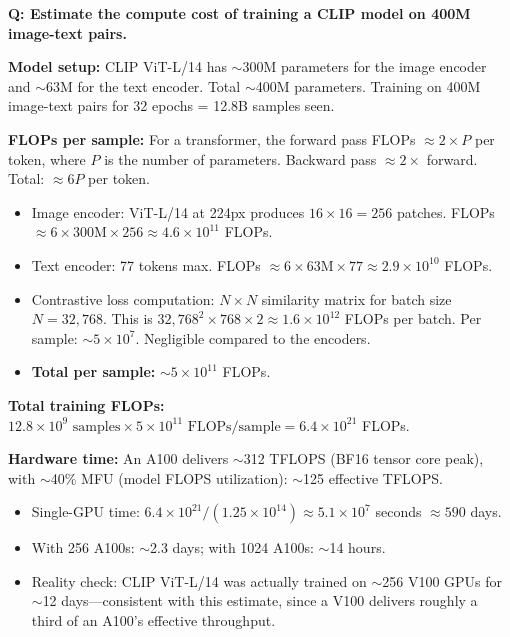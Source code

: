 \begin{interviewq}
\textbf{Q: Estimate the compute cost of training a CLIP model on 400M image-text pairs.}

 \quad {} \quad \badgefreq{\freqlow}

\stronganswer

\textbf{Model setup:} CLIP ViT-L/14 has $\sim$300M parameters for the image encoder and $\sim$63M for the text encoder. Total $\sim$400M parameters. Training on 400M image-text pairs for 32 epochs = 12.8B samples seen.

\textbf{FLOPs per sample:} For a transformer, the forward pass FLOPs $\approx 2 \times P$ per token, where $P$ is the number of parameters. Backward pass $\approx 2\times$ forward. Total: $\approx 6P$ per token.
\begin{itemize}
    \item Image encoder: ViT-L/14 at 224px produces $16 \times 16 = 256$ patches. FLOPs $\approx 6 \times 300\text{M} \times 256 \approx 4.6 \times 10^{11}$ FLOPs.
    \item Text encoder: 77 tokens max. FLOPs $\approx 6 \times 63\text{M} \times 77 \approx 2.9 \times 10^{10}$ FLOPs.
    \item Contrastive loss computation: $N \times N$ similarity matrix for batch size $N = 32{,}768$. This is $32{,}768^2 \times 768 \times 2 \approx 1.6 \times 10^{12}$ FLOPs per batch. Per sample: $\sim 5 \times 10^7$. Negligible compared to the encoders.
    \item \textbf{Total per sample:} $\sim 5 \times 10^{11}$ FLOPs.
\end{itemize}

\textbf{Total training FLOPs:} $12.8 \times 10^9 \text{ samples} \times 5 \times 10^{11} \text{ FLOPs/sample} = 6.4 \times 10^{21}$ FLOPs.

\textbf{Hardware time:} An A100 delivers $\sim$312 TFLOPS (BF16 tensor core peak), with $\sim$40\% MFU (model FLOPS utilization): $\sim$125 effective TFLOPS.
\begin{itemize}
    \item Single-GPU time: $6.4 \times 10^{21} / (1.25 \times 10^{14}) \approx 5.1 \times 10^7$ seconds $\approx 590$ days.
    \item With 256 A100s: $\sim$2.3 days; with 1024 A100s: $\sim$14 hours.
    \item Reality check: CLIP ViT-L/14 was actually trained on $\sim$256 V100 GPUs for $\sim$12 days---consistent with this estimate, since a V100 delivers roughly a third of an A100's effective throughput.
\end{itemize}


\end{interviewq}
